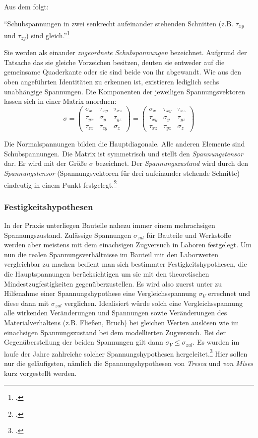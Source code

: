 \documentclass[12pt,a4paper,parskip]{scrartcl}
\begin{document}
{Aus dem folgt:

"`Schubspannungen in zwei senkrecht aufeinander stehenden Schnitten (z.B. $\tau_{xy}$ und $\tau_{zy}$) sind gleich."'\footcite[Vgl.][46]{tmr}

Sie werden als einander \emph{zugeordnete Schubspannungen} bezeichnet. Aufgrund der Tatsache das sie gleiche Vorzeichen besitzen, deuten sie entweder auf die gemeinsame Quaderkante oder sie sind beide von ihr abgewandt. Wie aus den oben angeführten Identitäten zu erkennen ist, existieren lediglich sechs unabhängige Spannungen. Die Komponenten der jeweiligen Spannungsvektoren lassen sich in einer Matrix anordnen:
\begin{equation}
\sigma = \begin{pmatrix}
\sigma_x & \tau_{xy} & \tau_{xz}\\
\tau_{yx} & \sigma_y & \tau_{yz}\\
\tau_{zx} & \tau_{zy} & \sigma_z
\end{pmatrix} = \begin{pmatrix}
\sigma_x & \tau_{xy} & \tau_{xz}\\
\tau_{xy} & \sigma_y & \tau_{yz}\\
\tau_{xz} & \tau_{yz} & \sigma_z
\end{pmatrix}
\end{equation}

Die Normalspannungen bilden die Hauptdiagonale. Alle anderen Elemente sind Schubspannungen. Die Matrix ist symmetrisch und stellt den \emph{Spannungstensor} dar. Er wird mit der Größe $ \sigma $ bezeichnet. Der \emph{Spannungszustand} wird durch den \emph{Spannungstensor} (Spannungsvektoren für drei aufeinander stehende Schnitte) eindeutig in einem Punkt festgelegt.\footcite[Vgl.][43-46]{tmr}
\subsubsection{Festigkeitshypothesen}
In der Praxis unterliegen Bauteile nahezu immer einem mehrachsigen Spannungszustand. Zulässige Spannungen $ \sigma_{zul} $ für Bauteile und Werkstoffe werden aber meistens mit dem einachsigen Zugversuch in Laboren festgelegt. Um nun die realen Spannungsverhältnisse im Bauteil mit den Laborwerten vergleichbar zu machen bedient man sich bestimmter Festigkeitshypothesen, die die Hauptspannungen berücksichtigen um sie mit den theoretischen Mindestzugfestigkeiten gegenüberzustellen. Es wird also zuerst unter zu Hilfenahme einer Spannungshypothese eine Vergleichsspannung $ \sigma_V $ errechnet  und diese dann mit $ \sigma_{zul} $ verglichen. Idealisiert würde solch eine Vergleichsspannung alle wirkenden Veränderungen und Spannungen sowie Veränderungen des Materialverhaltens (z.B. Fließen, Bruch) bei gleichen Werten auslösen wie im einachsigen Spannungszustand bei dem modellierten Zugversuch. Bei der Gegenüberstellung der beiden Spannungen gilt dann $ \sigma_V \leq \sigma_{zul} $. Es wurden im laufe der Jahre zahlreiche solcher Spannungshypothesen hergeleitet.\footcite[Vgl.][399]{dd} Hier sollen nur die geläufigsten, nämlich die Spannungshypothesen von  \emph{Tresca} und \emph{von Mises} kurz vorgestellt werden.

}
\end{document}
